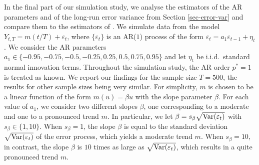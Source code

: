 In the final part of our simulation study, we analyse the estimators of the AR parameters and of the long-run error variance from Section \ref{sec-error-var} and compare them to the estimators of \cite{Hall2003}. We simulate data from the model $Y_{t,T} = m(t/T) + \varepsilon_t$, where $\{ \varepsilon_t\}$ is an AR($1$) process of the form $\varepsilon_t = a_1 \varepsilon_{t-1} + \eta_t$. We consider the AR parameters $a_1 \in \{-0.95,-0.75,-0.5,-0.25,0.25,0.5,0.75,0.95\}$ and let $\eta_t$ be i.i.d.\ standard normal innovation terms. Throughout the simulation study, the AR order $p^*=1$ is treated as known. We report our findings for the sample size $T=500$, the results for other sample sizes being very similar. For simplicity, $m$ is chosen to be a linear function of the form $m(u) = \beta u$ with the slope parameter $\beta$. For each value of $a_1$, we consider two different slopes $\beta$, one corresponding to a moderate and one to a pronounced trend $m$. In particular, we let $\beta = s_\beta \sqrt{\textnormal{Var}(\varepsilon_t)}$ with $s_\beta \in \{1,10\}$. When $s_\beta = 1$, the slope $\beta$ is equal to the standard deviation $\sqrt{\textnormal{Var}(\varepsilon_t)}$ of the error process, which yields a moderate trend $m$. When $s_\beta = 10$, in contrast, the slope $\beta$ is $10$ times as large as $\sqrt{\textnormal{Var}(\varepsilon_t)}$, which results in a quite pronounced trend $m$. 


